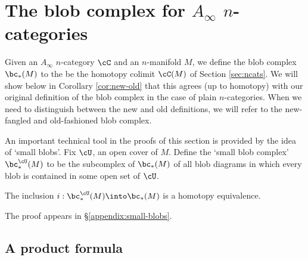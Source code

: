 
\section{The blob complex for $A_\infty$ $n$-categories}
\label{sec:ainfblob}

Given an $A_\infty$ $n$-category $\cC$ and an $n$-manifold $M$, we define the blob
complex $\bc_*(M)$ to the be the homotopy colimit $\cC(M)$ of Section \ref{sec:ncats}.
We will show below 
in Corollary \ref{cor:new-old}
that this agrees (up to homotopy) with our original definition of the blob complex
in the case of plain $n$-categories.
When we need to distinguish between the new and old definitions, we will refer to the 
new-fangled and old-fashioned blob complex.

\medskip

An important technical tool in the proofs of this section is provided by the idea of `small blobs'.
Fix $\cU$, an open cover of $M$.
Define the `small blob complex' $\bc^{\cU}_*(M)$ to be the subcomplex of $\bc_*(M)$ of all blob diagrams in which every blob is contained in some open set of $\cU$. 

\begin{thm} \label{thm:small-blobs}
The inclusion $i: \bc^{\cU}_*(M) \into \bc_*(M)$ is a homotopy equivalence.
\end{thm}
The proof appears in \S \ref{appendix:small-blobs}.

\subsection{A product formula}
\label{ss:product-formula}



